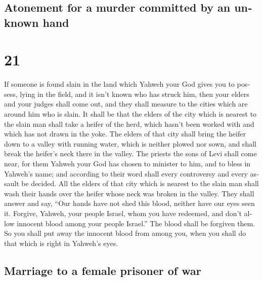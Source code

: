 \begin{paracol}{2}
\switchcolumn
\begin{otherlanguage}{english}

\hypertarget{atonement-for-a-murder-committed-by-an-unknown-hand}{%
\subsection{Atonement for a murder committed by an unknown
hand}\label{atonement-for-a-murder-committed-by-an-unknown-hand}}

\hypertarget{section-41}{%
\section{21}\label{section-41}}

 If someone is found slain in the land which Yahweh your
God gives you to possess, lying in the field, and it isn't known who has
struck him,  then your elders and your judges shall come
out, and they shall measure to the cities which are around him who is
slain.  It shall be that the elders of the city which is
nearest to the slain man shall take a heifer of the herd, which hasn't
been worked with and which has not drawn in the yoke.  The
elders of that city shall bring the heifer down to a valley with running
water, which is neither plowed nor sown, and shall break the heifer's
neck there in the valley.  The priests the sons of Levi
shall come near, for them Yahweh your God has chosen to minister to him,
and to bless in Yahweh's name; and according to their word shall every
controversy and every assault be decided.  All the elders
of that city which is nearest to the slain man shall wash their hands
over the heifer whose neck was broken in the valley.  They
shall answer and say, ``Our hands have not shed this blood, neither have
our eyes seen it.  Forgive, Yahweh, your people Israel,
whom you have redeemed, and don't allow innocent blood among your people
Israel.'' The blood shall be forgiven them.  So you shall
put away the innocent blood from among you, when you shall do that which
is right in Yahweh's eyes.

\hypertarget{marriage-to-a-female-prisoner-of-war}{%
\subsection{Marriage to a female prisoner of
war}\label{marriage-to-a-female-prisoner-of-war}}


\end{otherlanguage}
\end{paracol}
